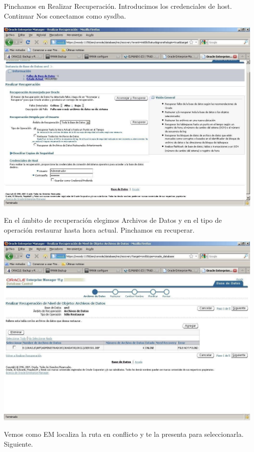 \documentclass[12pt,letterpaper]{article}
\begin{document}
{Pinchamos en Realizar Recuperación. Introducimos los credenciales de host. Continuar Nos conectamos como sysdba.

\newpage
\includegraphics[width=14cm]{./IMG/img42.jpg}

En el ámbito de recuperación elegimos Archivos de Datos y en el tipo de operación restaurar hasta hora actual. Pinchamos en recuperar.

\newpage
\includegraphics[width=14cm]{./IMG/img43.jpg}

Vemos  como  EM  localiza  la  ruta  en  conflicto  y  te  la  presenta  para  seleccionarla. Siguiente.

}
\end{document}
